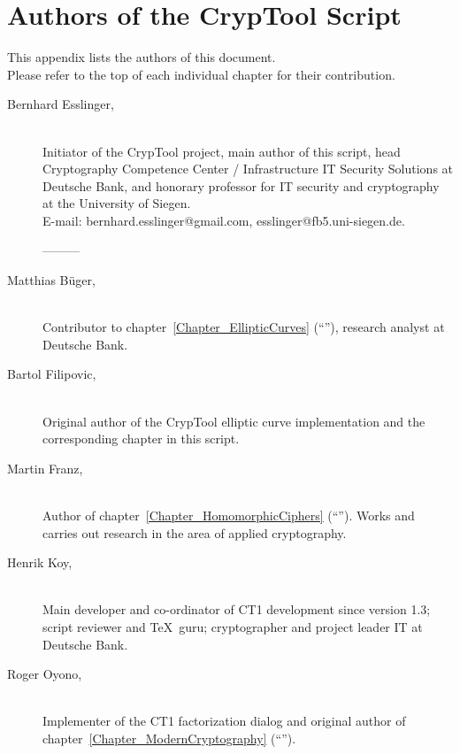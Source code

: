 \newpage
\hypertarget{appendix-authors}{}
\section{Authors of the CrypTool Script}
\label{s:appendix-authors}

This appendix lists the authors of this document.\\
Please refer to the top of each individual chapter for their contribution.

\begin{description}

\item[Bernhard Esslinger,] \mbox{}\\
Initiator of the CrypTool project, main author of this script, head Cryptography Competence Center / Infrastructure IT Security Solutions at Deutsche Bank, and honorary professor for IT security and cryptography at the University of
Siegen.\\
E-mail: bernhard.esslinger@gmail.com, esslinger@fb5.uni-siegen.de.

---------

\item[Matthias B\"uger,] \mbox{}\\ 
Contributor to chapter~\ref{Chapter_EllipticCurves} (``''),
research analyst at Deutsche Bank.

\item[Bartol Filipovic,] \mbox{}\\
Original author of the CrypTool elliptic curve
implementation and the corresponding chapter in this script.

\item[Martin Franz,] \mbox{}\\
Author of chapter~\ref{Chapter_HomomorphicCiphers}
(``'').
Works and carries out research in the area of applied cryptography.

\item[Henrik Koy,] \mbox{}\\
Main developer and co-ordinator of CT1 development
since version 1.3; script reviewer and \TeX\ guru; cryptographer 
and project leader IT at Deutsche Bank.

\item[Roger Oyono,] \mbox{}\\
Implementer of the CT1 factorization dialog and original author
of chapter~\ref{Chapter_ModernCryptography} (``'').


\end{description}
